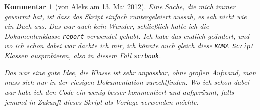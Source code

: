 \documentclass[paper = A4, fontsize=12pt, numbers=noendperiod, chapterprefix=true]{scrbook}
\theoremstyle{break}
\theoremstyle{nonumberbreak}
\newtheorem{komm}{Kommentar}
\theoremstyle{nonumberplain}
\begin{document}
\begin{komm}[von Aleks am 13. Mai 2012]
Eine Sache, die mich immer gewurmt hat, ist dass das Skript einfach runtergeleiert aussah, es sah nicht wie ein Buch aus. Das war auch kein Wunder, schlie\ss lich hatte ich die Dokumentenklasse \verb!report! verwendet gehabt. Ich habe das endlich ge\"andert, und wo ich schon dabei war dachte ich mir, ich k\"onnte auch gleich diese \verb!KOMA Script! Klassen ausprobieren, also in diesem Fall \verb!scrbook!.

Das war eine gute Idee, die Klasse ist sehr anpassbar, ohne gro\ss en Aufwand, man muss sich nur in der riesigen Dokumentation zurechtfinden. Wo ich schon dabei war habe ich den Code ein wenig besser kommentiert und aufger\"aumt, falls jemand in Zukunft dieses Skript als Vorlage verwenden m\"ochte.
\end{komm}
\end{document}
